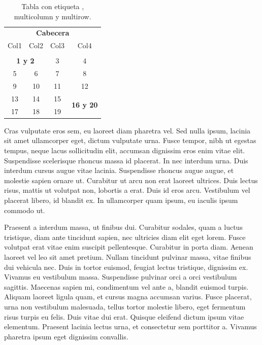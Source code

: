 \documentclass[a4paper,10pt]{article}
\theoremstyle{teorema}
\theoremstyle{plano}
\theoremstyle{titulo}
\begin{document}
\begin{table}[b]
\centering
\begin{tabular}{cccc}
\multicolumn{4}{c}{\textbf{Cabecera}}  \\
Col1                 & Col2                 & Col3                 & Col4                              \\ 
\multicolumn{1}{c}{} & \multicolumn{1}{c}{} & \multicolumn{1}{c}{} & \multicolumn{1}{c}{}              \\ \hline
\multicolumn{2}{c}{\textbf{1 y 2}}                     & 3                    & 4                                 \\ \hline
5                    & 6                    & 7                    & 8                                 \\ \hline
9                    & 10                   & 11                   & 12                                \\ \hline
13                   & 14                   & 15                   & \multirow{2}{*}{\textbf{16 y 20}} \\ \cline{1-3}
17                   & 18                   & 19                   &                    \\        \hline
\end{tabular}
\caption{Tabla con etiqueta , multicolumn y multirow.}
\label{tab:2}
\end{table}



Cras vulputate eros sem, eu laoreet diam pharetra vel. Sed nulla ipsum, lacinia sit amet ullamcorper eget, dictum vulputate urna. Fusce tempor, nibh ut egestas tempus, neque lacus sollicitudin elit, accumsan dignissim eros enim vitae elit. Suspendisse scelerisque rhoncus massa id placerat. In nec interdum urna. Duis interdum cursus augue vitae lacinia. Suspendisse rhoncus augue augue, et molestie sapien ornare ut. Curabitur ut arcu non erat laoreet ultrices. Duis lectus risus, mattis ut volutpat non, lobortis a erat. Duis id eros arcu. Vestibulum vel placerat libero, id blandit ex. In ullamcorper quam ipsum, eu iaculis ipsum commodo ut.

Praesent a interdum massa, ut finibus dui. Curabitur sodales, quam a luctus tristique, diam ante tincidunt sapien, nec ultricies diam elit eget lorem. Fusce volutpat erat vitae enim suscipit pellentesque. Curabitur in porta diam. Aenean laoreet vel leo sit amet pretium. Nullam tincidunt pulvinar massa, vitae finibus dui vehicula nec. Duis in tortor euismod, feugiat lectus tristique, dignissim ex. Vivamus eu vestibulum massa. Suspendisse pulvinar orci a orci vestibulum sagittis. Maecenas sapien mi, condimentum vel ante a, blandit euismod turpis. Aliquam laoreet ligula quam, et cursus magna accumsan varius. Fusce placerat, urna non vestibulum malesuada, tellus tortor molestie libero, eget fermentum risus turpis eu felis. Duis vitae dui erat. Quisque eleifend dictum ipsum vitae elementum. Praesent lacinia lectus urna, et consectetur sem porttitor a. Vivamus pharetra ipsum eget dignissim convallis.
\end{document}
